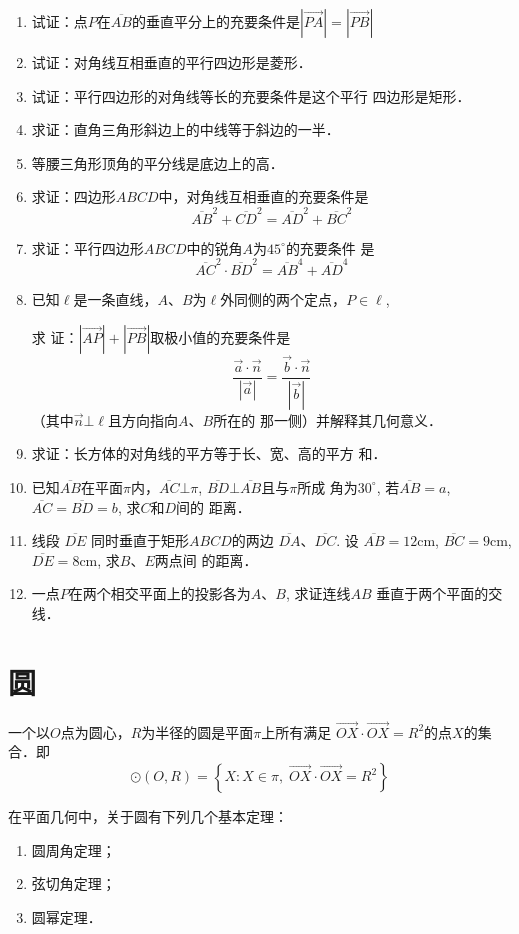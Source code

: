 \begin{enumerate}
    \item 试证：点$P$在$\overline{AB}$的垂直平分上的充要条件是$|\Vec{PA}|=|\Vec{PB}|$
\item 试证：对角线互相垂直的平行四边形是菱形．
\item 试证：平行四边形的对角线等长的充要条件是这个平行
四边形是矩形．
\item 求证：直角三角形斜边上的中线等于斜边的一半．
\item 等腰三角形顶角的平分线是底边上的高．
\item 求证：四边形$ABCD$中，对角线互相垂直的充要条件是
\[\overline{AB}^2 +\overline{CD}^2=\overline{AD}^2+\overline{BC}^2\]
\item 求证：平行四边形$ABCD$中的锐角$A$为$45^{\circ}$的充要条件
是$$\overline{AC}^2\cdot \overline{BD}^2=\overline{AB}^4+\overline{AD}^4$$
\item 已知$\ell$是一条直线，$A$、$B$为$\ell$外同侧的两个定点，$P\in\ell$, 

求
证：$|\Vec{AP}|+|\Vec{PB}|$取极小值的充要条件是
\[\frac{\vec{a}\cdot \vec{n}}{|\vec{a}|}=\frac{\vec{b}\cdot \vec{n}}{|\vec{b}|}\]
（其中$\vec{n}\bot \ell$且方向指向$A$、$B$所在的
那一侧）并解释其几何意义．
\item 求证：长方体的对角线的平方等于长、宽、高的平方
和．
\item 已知$\overline{AB}$在平面$\pi$内，$\overline{AC}\bot\pi$, $\overline{BD}\bot \overline{AB}$且与$\pi$所成
角为$30^{\circ}$, 若$\overline{AB}=a$, $\overline{AC}=\overline{BD}=b$, 求$C$和$D$间的
距离．
\item 线段
$\overline{DE}$
同时垂直于矩形$ABCD$的两边
$\overline{DA}$、$\overline{DC}$. 设
$\overline{AB}=12$cm, $\overline{BC}=9$cm, $\overline{DE}
=8$cm, 求$B$、$E$两点间
的距离．
\item 一点$P$在两个相交平面上的投影各为$A$、$B$, 求证连线$AB$
垂直于两个平面的交线．
\end{enumerate}


\section{圆}

一个以$O$点为圆心，$R$为半径的圆是平面$\pi$上所有满足
$\Vec{OX}\cdot\Vec{OX}=R^2$的点$X$的集合．即
\[\odot (O,R)=\left\{X:X\in \pi,\; \Vec{OX}\cdot\Vec{OX}=R^2\right\}\]

在平面几何中，关于圆有下列几个基本定理：
\begin{enumerate}
\item 圆周角定理；
\item 弦切角定理；
\item 圆幂定理．
\end{enumerate}

